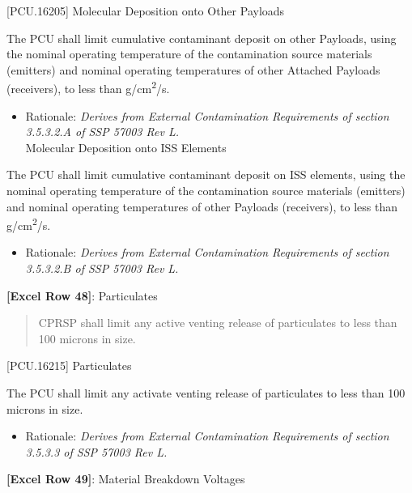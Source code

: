 [PCU.16205] Molecular Deposition onto Other Payloads

The PCU shall limit cumulative contaminant deposit on other Payloads, using the nominal operating temperature of the contamination source materials (emitters) and nominal operating temperatures of other Attached Payloads (receivers), to less than  g\slash cm\textsuperscript{2}\slash s.

\begin{itemize}
\item{} Rationale: \emph{Derives from External Contamination Requirements of section 3.5.3.2.A of SSP 57003 Rev L.}\\
[PCU.16210] Molecular Deposition onto ISS Elements

\end{itemize}

The PCU shall limit cumulative contaminant deposit on ISS elements, using the nominal operating temperature of the contamination source materials (emitters) and nominal operating temperatures of other Payloads (receivers), to less than  g\slash cm\textsuperscript{2}\slash s.

\begin{itemize}
\item{} Rationale: \emph{Derives from External Contamination Requirements of section 3.5.3.2.B of SSP 57003 Rev L.}

\end{itemize}

\textbf{[Excel Row 48]}: Particulates

\begin{quote}
CPRSP shall limit any active venting release of particulates to less than 100 microns in size.
\end{quote}

[PCU.16215] Particulates

The PCU shall limit any activate venting release of particulates to less than 100 microns in size.

\begin{itemize}
\item{} Rationale: \emph{Derives from External Contamination Requirements of section 3.5.3.3 of SSP 57003 Rev L.}

\end{itemize}

\textbf{[Excel Row 49]}: Material Breakdown Voltages

